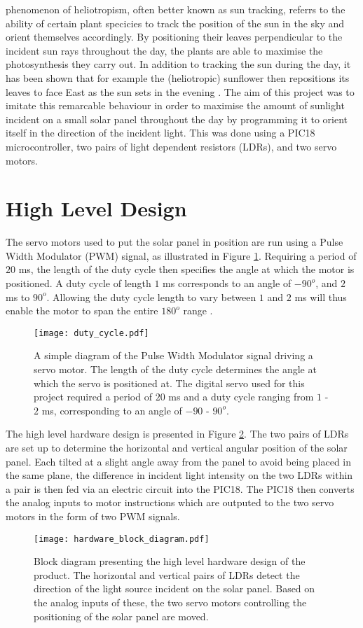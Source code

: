 \documentclass[journal]{Imperial_lab_report}
\begin{document}
 phenomenon of heliotropism, often better known as sun tracking, referrs to the ability of certain plant specicies to track the position of the sun in the sky and orient themselves accordingly. By positioning their leaves perpendicular to the incident sun rays throughout the day, the plants are able to maximise the photosynthesis they carry out. In addition to tracking the sun during the day, it has been shown that for example the (heliotropic) sunflower then repositions its leaves to face East as the sun sets in the evening \cite{sunflower}. The aim of this project was to imitate this remarcable behaviour in order to maximise the amount of sunlight incident on a small solar panel throughout the day by programming it to orient itself in the direction of the incident light. This was done using a PIC18 microcontroller, two pairs of light dependent resistors (LDRs), and two servo motors. 


\section{High Level Design}
The servo motors used to put the solar panel in position are run using a Pulse Width Modulator (PWM) signal, as illustrated in Figure \ref{duty cycle}. Requiring a period of $20$ ms, the length of the duty cycle then specifies the angle at which the motor is positioned. A duty cycle of length $1$ ms corresponds to an angle of $-90^{o}$, and $2$ ms to $90^{o}$. Allowing the duty cycle length to vary between $1$ and $2$ ms will thus enable the motor to span the entire $180^{o}$ range \cite{servo}.
\begin{figure}[!b]
	\centering
	\texttt{[image: duty\_cycle.pdf]}
	\caption{A simple diagram of the Pulse Width Modulator signal driving a servo motor. The length of the duty cycle determines the angle at which the servo is positioned at. The digital servo used for this project required a period of $20$ ms and a duty cycle ranging from $1$ - $2$ ms, corresponding to an angle of $-90$ - $90^{o}$. }
	\label{duty cycle}
\end{figure}

The high level hardware design is presented in Figure \ref{block diagram}. The two pairs of LDRs are set up to determine the horizontal and vertical angular position of the solar panel. Each tilted at a slight angle away from the panel to avoid being placed in the same plane, the difference in incident light intensity on the two LDRs within a pair is then fed via an electric circuit into the PIC18. The PIC18 then converts the analog inputs to motor instructions which are outputed to the two servo motors in the form of two PWM signals. 
\begin{figure}[!t]
	\centering
	\texttt{[image: hardware\_block\_diagram.pdf]}
	\caption{Block diagram presenting the high level hardware design of the product. The horizontal and vertical pairs of LDRs detect the direction of the light source incident on the solar panel. Based on the analog inputs of these, the two servo motors controlling the positioning of the solar panel are moved. }
	\label{block diagram}
\end{figure}
\end{document}
